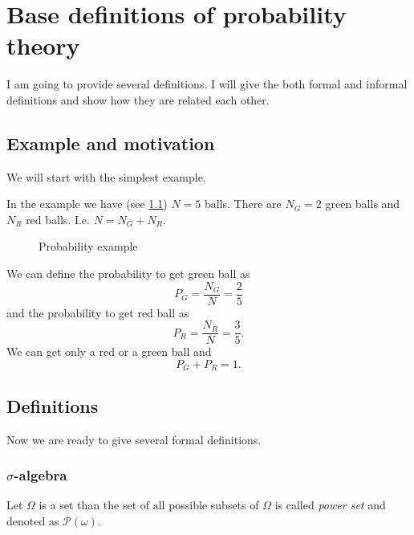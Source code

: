 \chapter{Base definitions of probability theory}
I am going to provide several definitions. I will give the both formal
and informal definitions and show how they are related each other.

\section{Example and motivation}
We will start with the simplest example. 
\begin{example}
\label{ex:initial}
In the example we have (see \cref{fig:simpleprobability}) $N=5$ balls.
There are $N_G = 2$ green balls and $N_R$ red balls. I.e. $N = N_G +
N_R$.  
\begin{figure}[H]
  \centering
  \caption{Probability example}
  \label{fig:simpleprobability}
\end{figure}

We can define the probability to get green ball as
\[
P_G = \frac{N_G}{N} = \frac{2}{5}
\]
and the probability to get red ball as
\[
P_R = \frac{N_R}{N} = \frac{3}{5}.
\]
We can get only a red or a green ball and 
\[
P_G + P_R = 1.
\]
\end{example}

\section{Definitions}
Now we are ready to give several formal definitions. 
\subsection{$\sigma$-algebra}
\begin{definition}
\label{def:powerset}
Let $\Omega$ is a set than the set of all possible subsets of $\Omega$
is called \textit{power set} and denoted as
$\mathcal{P}\left(\omega\right)$. 
\end{definition}

